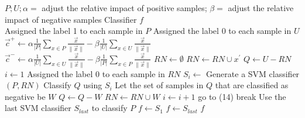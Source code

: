 \documentclass{article}
\begin{document}
\begin{algorithm}[!h]
\renewcommand{\algorithmicrequire}{\textbf{Input:}} %
\renewcommand{\algorithmicensure}{\textbf{Output:}} %
	\caption{Roc-SVM} %
	\begin{algorithmic}[1] %
	    \REQUIRE
	    $P;U;\alpha=$ adjust the relative impact of positive samples; $\beta=$ adjust the relative impact of negative samples
	    \ENSURE
	    Classifier $f$ \\
	    \STATE Assigned the label 1 to each sample in $P$
		\STATE Assigned the label 0 to each sample in $U$
	    \STATE $\vec{c}^{+}\leftarrow \alpha \frac{1}{|P|} \sum_{x \in P} \frac{\vec{x}}{\|\vec{x}\|}-\beta \frac{1}{|U|} \sum_{x \in U} \frac{\vec{x}}{\|\vec{x}\|}$
	    \STATE $\vec{c}^{-}\leftarrow \alpha \frac{1}{|U|} \sum_{x \in U} \frac{\vec{x}}{\|\vec{x}\|}-\beta \frac{1}{|P|} \sum_{x \in P} \frac{\vec{x}}{\|\vec{x}\|}$
	    \STATE $RN\leftarrow \emptyset$
	    \STATE $RN\leftarrow RN\cup x^{'}$
	    \ENDIF
	    \ENDFOR
	    \STATE $Q\leftarrow U-RN$
	    \STATE $i\leftarrow 1$
	    \STATE Assigned the label 0 to each sample in $RN$
	    \STATE $S_i\leftarrow$ Generate a SVM classifier$(P,RN)$
	    \STATE Classify $Q$ using $S_i$
	    \STATE Let the set of samples in $Q$ that are classified as negative be $W$
	    \STATE $Q\leftarrow Q-W$
	    \STATE $RN\leftarrow RN\cup W$
	    \STATE $i\leftarrow i+1$
	    \STATE go to (14)
	    \ELSE
	    \STATE break
	    \ENDIF
	    \STATE Use the last SVM classifier $S_{last}$ to classify $P$
	    \STATE $f\leftarrow S_1$
	    \ELSE
	    \STATE $f\leftarrow S_{last}$
	    \ENDIF
	    \RETURN $f$
	\end{algorithmic}
\end{algorithm}
\end{document}
